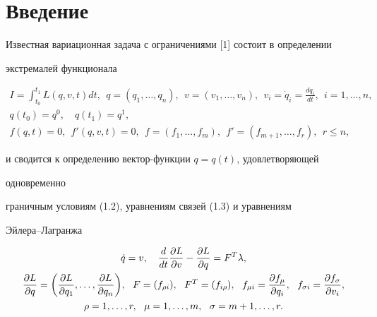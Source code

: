 \maketitle 


\label{begin} 


 


 


\section{Введение} 


 


Известная вариационная задача с ограничениями [1] состоит в определении 


экстремалей функционала 


\begin{gather} 


I=\int^{t_1}_{t_0}L(q,v,t)d t,\ \ q=(q_1,\dotsc,q_n), 


\ \ v=(v_1,\dotsc,v_n), \ \ v_i=\Dot q_i=\frac{d q_i}{d t}, 


\ \ i=1,\dotsc,n,\\ 


% 


q(t_0)=q^0,\quad q(t_1)=q^1, \\ 


% 


f(q,t)=0,\ \ f'(q,v,t)=0,\ \ f=(f_1,\dotsc,f_m), 


\ \ f'=(f_{m+1},\dotsc,f_r),\ \ r\le n, 


\end{gather} 


и сводится к определению вектор-функции $q=q(t)$, удовлетворяющей 


одновременно 


граничным условиям (1.2), уравнениям связей (1.3) и уравнениям 


Эйлера--Лагранжа 


\begin{gather} 


\Dot q=v,\quad \frac{d}{d t}\frac{\partial L}{\partial v} 


-\frac{\partial L}{\partial q}=F^T\lambda,\\ 


% 


\frac{\partial L}{\partial q}=\bigg( 


\frac{\partial L}{\partial q_1},\dotsc, 


\frac{\partial L}{\partial q_n}\bigg),\ \ F=(f_{\rho i}), 


\ \ F^T=(f_{i\rho}),\ \ f_{\mu i}= 


\frac{\partial f_\mu}{\partial q_i}, 


\ \ f_{\sigma i}=\frac{\partial f_\sigma}{\partial v_i},\notag \\ 


\rho=1,\dotsc,r,\ \ \mu=1,\dotsc,m,\ \ \sigma=m+1,\dotsc,r. \notag


\end{gather} 


